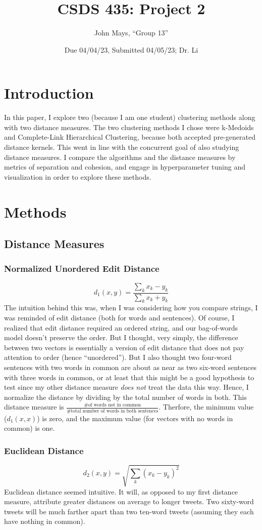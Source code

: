 \documentclass[fleqn]{article}
\title{\textbf{CSDS 435: Project 2}}
\author{John Mays, ``Group 13''}
\date{Due 04/04/23, Submitted 04/05/23; Dr. Li}
\begin{document}
\maketitle
\section{Introduction}
In this paper, I explore two (because I am one student) clustering methods along with two distance measures.  The two clustering methods I chose were k-Medoids and Complete-Link Hierarchical Clustering, because both accepted pre-generated distance kernels.  This went in line with the concurrent goal of also studying distance measures.  I compare the algorithms and the distance measures by metrics of separation and cohesion, and engage in hyperparameter tuning and visualization in order to explore these methods.
\section{Methods}
\subsection{Distance Measures}
\subsubsection{Normalized Unordered Edit Distance}
$$d_{1}(x,y)=\frac{\sum_{k}x_k-y_k}{\sum_{k}x_k+y_k}$$
The intuition behind this was, when I was considering how you compare strings, I was reminded of edit distance (both for words and sentences).  Of course, I realized that edit distance required an ordered string, and our bag-of-words model doesn't preserve the order.  But I thought, very simply, the difference between two vectors is essentially a version of edit distance that does not pay attention to order (hence ``unordered'').  But I also thought two four-word sentences with two words in common are about as near as two six-word sentences with three words in common, or at least that this might be a good hypothesis to test since my other distance measure \textit{does not} treat the data this way.  Hence, I normalize the distance by dividing by the total number of words in both.  This distance measure is $\frac{\text{\# of words not in common}}{\text{\# total number of words in both sentences}}$.  Therfore, the minimum value ($d_{1}(x,x)$) is zero, and the maximum value (for vectors with no words in common) is one.

\subsubsection{Euclidean Distance}
$$d_{2}(x,y)=\sqrt{\sum_{k}(x_k-y_k)^{2}}$$
Euclidean distance seemed intuitive.  It will, as opposed to my first distance measure, attribute greater distances on average to longer tweets.  Two sixty-word tweets will be much farther apart than two ten-word tweets (assuming they each have nothing in common).
\end{document}
